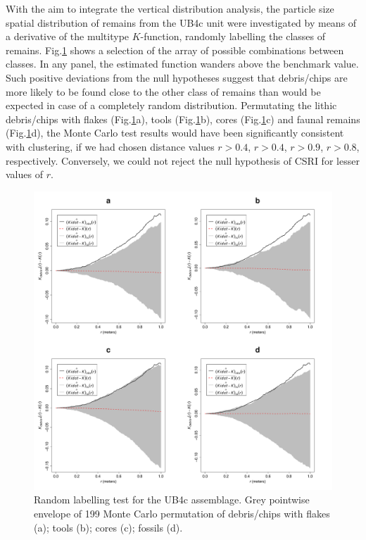 \documentclass[preprint,authoryear,times]{elsarticle} %
\begin{document}
With the aim to integrate the vertical distribution analysis, the particle size spatial distribution of remains from the UB4c unit were investigated by means of a derivative of the multitype $K$-function, randomly labelling the classes of remains. Fig.\ref{fig:13} shows a selection of the array of possible combinations between classes. In any panel, the estimated function wanders above the benchmark value. Such positive deviations from the null hypotheses suggest that debris/chips are more likely to be found close to the other class of remains than would be expected in case of a completely random distribution. Permutating the lithic debris/chips with flakes (Fig.\ref{fig:13}a), tools (Fig.\ref{fig:13}b), cores (Fig.\ref{fig:13}c) and faunal remains (Fig.\ref{fig:13}d), the Monte Carlo test results would have been significantly consistent with clustering, if we had chosen distance values $r > 0.4$, $r > 0.4$, $r > 0.9$, $r > 0.8$, respectively. Conversely, we could not reject the null hypothesis of CSRI for lesser values of $r$.

\begin{figure}[]
  \centering
  \includegraphics[width=1\textwidth]{../artwork/Fig13.pdf}
  \caption{Random labelling test for the UB4c assemblage. Grey pointwise envelope of 199 Monte Carlo permutation of debris/chips with flakes (a); tools (b); cores (c); fossils (d).}
  \label{fig:13}
\end{figure}
\end{document}
